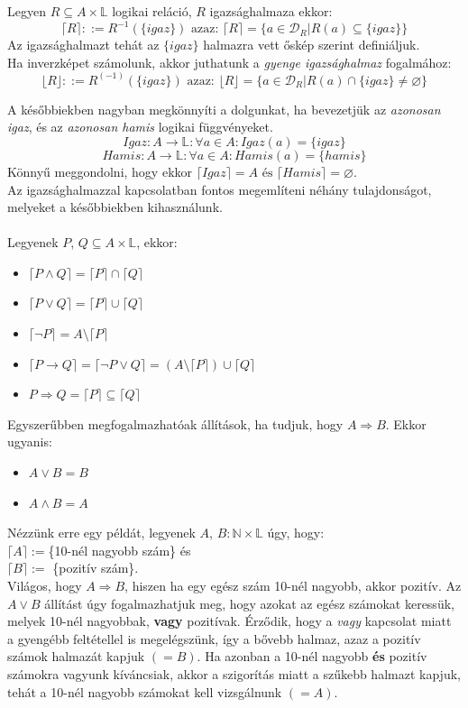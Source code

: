 \documentclass[12pt]{article}
\begin{document}
	Legyen $R \subseteq A \times \mathbb{L}$ logikai reláció, $R$ igazsághalmaza ekkor:
	$$  \lceil R \rceil ::= R^{-1}(\{igaz\}) \text{ azaz: } \lceil R \rceil = \{a \in \mathcal{D}_R | R(a) \subseteq \{igaz\} \} $$
	Az igazsághalmazt tehát az $\{igaz\}$ halmazra vett őskép szerint definiáljuk.\\
	Ha inverzképet számolunk, akkor juthatunk a \textit{gyenge igazsághalmaz} fogalmához:
	$$  \lfloor R \rfloor ::= R^{(-1)}(\{igaz\}) \text{ azaz: } \lfloor R \rfloor = \{a \in \mathcal{D}_R | R(a) \cap \{igaz\} \ne \varnothing \} $$
	
	A későbbiekben nagyban megkönnyíti a dolgunkat, ha bevezetjük az \textit{azonosan igaz}, és az \textit{azonosan hamis} logikai függvényeket.
	$$Igaz: A \rightarrow \mathbb{L}: \forall a \in A: Igaz(a) = \{igaz\} $$
	$$Hamis: A \rightarrow \mathbb{L}: \forall a \in A: Hamis(a) = \{hamis\} $$
	Könnyű meggondolni, hogy ekkor $\lceil Igaz \rceil = A \text{ és } \lceil Hamis \rceil = \varnothing $.\\
	Az igazsághalmazzal kapcsolatban fontos megemlíteni néhány tulajdonságot, melyeket a későbbiekben kihasználunk.\\
	\\
	Legyenek $P$, $Q \subseteq A \times \mathbb{L}$, ekkor:
	\begin{itemize}
		\item $ \lceil P \land Q \rceil = \lceil P \rceil \cap \lceil Q \rceil $
		\item $ \lceil P \lor Q \rceil = \lceil P \rceil \cup \lceil Q \rceil  $
		\item $	\lceil \neg P \rceil = A \setminus \lceil P \rceil  $
		\item $\lceil P \rightarrow Q \rceil = \lceil \neg P \lor Q \rceil = (A \setminus \lceil P \rceil) \cup \lceil Q \rceil $
		\item $ P \Rightarrow Q = \lceil P \rceil \subseteq \lceil Q \rceil $
	\end{itemize}
	
	Egyszerűbben megfogalmazhatóak állítások, ha tudjuk, hogy $A \Rightarrow B$. Ekkor ugyanis:
	\begin{itemize}
		\item $A \lor B = B$
		\item $A \land B = A$
	\end{itemize}
	Nézzünk erre egy példát, legyenek $A$, $B: \mathbb{N} \times \mathbb{L}$ úgy, hogy:\\
	$\lceil A \rceil := $\{10-nél nagyobb szám\} és\\
	$\lceil B \rceil := $ \{pozitív szám\}.\\
	Világos, hogy $A \Rightarrow B$, hiszen ha egy egész szám 10-nél nagyobb, akkor pozitív.
	Az $A \lor B$ állítást úgy fogalmazhatjuk meg, hogy azokat az egész számokat keressük, melyek 10-nél nagyobbak, \textbf{vagy} pozitívak. Érződik, hogy a \textit{vagy} kapcsolat miatt a gyengébb feltétellel is megelégszünk, így a bővebb halmaz, azaz a pozitív számok halmazát kapjuk $(=B)$. Ha azonban a 10-nél nagyobb \textbf{és} pozitív számokra vagyunk kíváncsiak, akkor a szigorítás miatt a szűkebb halmazt kapjuk, tehát a 10-nél nagyobb számokat kell vizsgálnunk $(=A)$.
	
\end{document}
